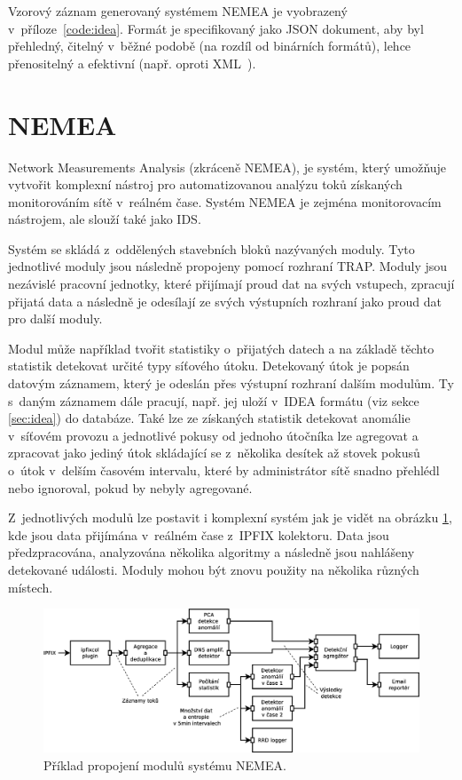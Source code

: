 Vzorový záznam generovaný systémem NEMEA je vyobrazený v~příloze~\ref{code:idea}. Formát je specifikovaný jako JSON dokument, aby byl přehledný, čitelný v~běžné podobě (na rozdíl od binárních formátů), lehce přenositelný a efektivní (např. oproti XML~\cite{xmlvsjson}).

\section{NEMEA}

Network Measurements Analysis (zkráceně NEMEA), je systém, který umožňuje vytvořit komplexní nástroj pro automatizovanou analýzu toků získaných monitorováním sítě v~reálném čase. Systém NEMEA je zejména monitorovacím nástrojem, ale slouží také jako IDS.

Systém se skládá z~oddělených stavebních bloků nazývaných moduly. Tyto jednotlivé moduly jsou následně propojeny pomocí rozhraní TRAP. Moduly jsou nezávislé pracovní jednotky, které přijímají proud dat na svých vstupech, zpracují přijatá data a následně je odesílají ze svých výstupních rozhraní jako proud dat pro další moduly. 

Modul může například tvořit statistiky o~přijatých datech a na základě těchto statistik detekovat určité typy síťového útoku. Detekovaný útok je popsán datovým záznamem, který je odeslán přes výstupní rozhraní dalším modulům. Ty s~daným záznamem dále pracují, např. jej uloží v~IDEA formátu (viz sekce \ref{sec:idea}) do databáze. Také lze ze získaných statistik detekovat anomálie v~síťovém provozu a jednotlivé pokusy od jednoho útočníka lze agregovat a zpracovat jako jediný útok skládající se z~několika desítek až stovek pokusů o~útok v~delším časovém intervalu, které by administrátor sítě snadno přehlédl nebo ignoroval, pokud by nebyly agregované.

Z~jednotlivých modulů lze postavit i komplexní systém jak je vidět na obrázku \ref{fig:nemea-example-2}, kde jsou data přijímána v~reálném čase z~IPFIX\cite{ipfix} kolektoru. Data jsou předzpracována, analyzována několika algoritmy a následně jsou nahlášeny detekované události. Moduly mohou být znovu použity na několika různých místech.

\begin{figure}[h]
    \centering
    \includegraphics[width=1\textwidth]{fig/nemea-example-2-cz.eps}
    \caption{Příklad propojení modulů systému NEMEA.} \label{fig:nemea-example-2}
  
\end{figure}

